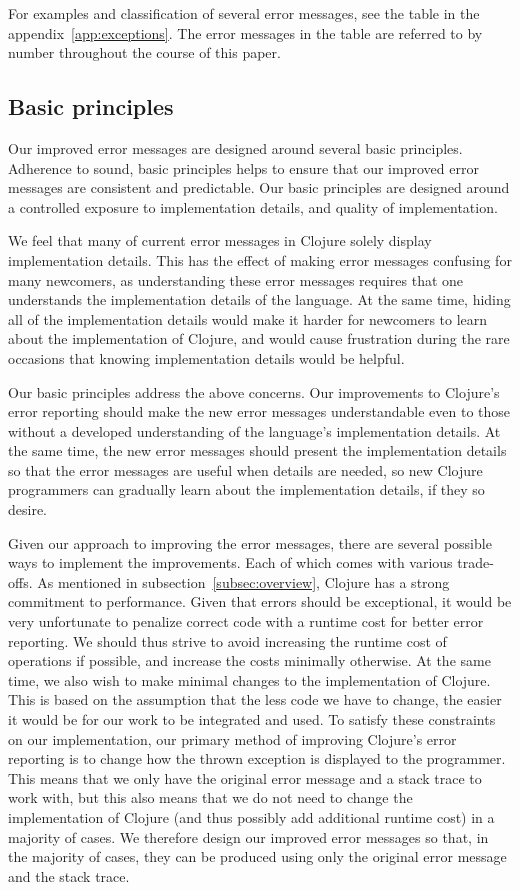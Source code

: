 \documentclass[12pt]{article}
\begin{document}
For examples and classification of several error messages,
see the table in the appendix~\ref{app:exceptions}. The error messages in the
table are referred to by number throughout the course of this paper.

\subsection{Basic principles}
Our improved error messages are designed around several basic principles.
Adherence to sound, basic principles helps to ensure that our improved error
messages are consistent and predictable. Our basic principles are designed
around a controlled exposure to implementation details, and quality of
implementation.

We feel that many of current error messages in Clojure solely display
implementation details. This has the effect of making error messages
confusing for many newcomers, as understanding these error messages requires
that one understands the implementation details of the language. At the same time, hiding all of
the implementation details would make it harder for newcomers to learn about the
implementation of Clojure, and would cause frustration during the rare occasions
that knowing implementation details would be helpful.

Our basic principles address the above concerns. Our improvements to Clojure's error 
reporting should make the new error messages understandable even to those without a 
developed understanding of the language's implementation details. At the same time, the new
error messages should present the implementation details so that the error
messages are useful when details are needed, so new Clojure programmers
can gradually learn about the implementation details, if they so desire.

Given our approach to improving the error messages, there are several
possible ways 
to implement the improvements. Each of which comes with various
trade-offs. As mentioned in 
subsection~\ref{subsec:overview}, Clojure has a strong commitment to
performance. Given that errors should be exceptional, it would be very
unfortunate to penalize correct code with a runtime cost for better error
reporting. We should thus strive to avoid increasing the runtime cost of
operations if possible, and increase the costs minimally otherwise. At the same
time, we also wish to make minimal changes to the implementation of
Clojure. This is based on the assumption that the less code we have to change,
the easier it would be for our work to be integrated and used.
To satisfy these constraints on our implementation, our primary method of
improving Clojure's error reporting is to change how the thrown exception is displayed
to the programmer. This means that we only have the original error message
and a stack trace to work with, but this also means that we do not need to
change the implementation of Clojure (and thus possibly add additional
runtime cost) in a majority of cases. We therefore design our improved error messages
so that, in the majority of cases, they can be produced using only the original
error message and the stack trace.
\end{document}
